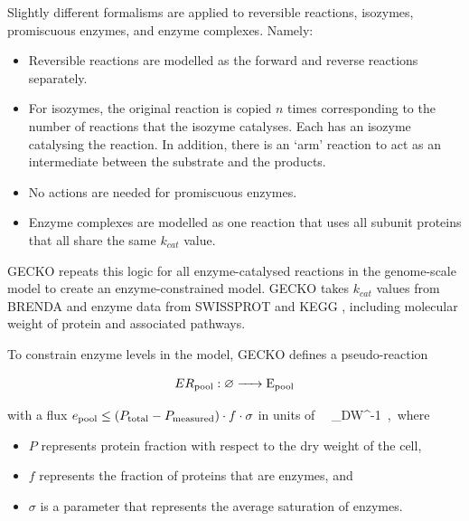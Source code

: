 
Slightly different formalisms are applied to reversible reactions, isozymes, promiscuous enzymes, and enzyme complexes.  Namely:
\begin{itemize}
  \item Reversible reactions are modelled as the forward and reverse reactions separately.
  \item For isozymes, the original reaction is copied $n$ times corresponding to the number of reactions that the isozyme catalyses. Each has an isozyme catalysing the reaction.
  In addition, there is an `arm' reaction to act as an intermediate between the substrate and the products.
  \item No actions are needed for promiscuous enzymes.
  \item Enzyme complexes are modelled as one reaction that uses all subunit proteins that all share the same $k_{cat}$ value.
\end{itemize}

GECKO repeats this logic for all enzyme-catalysed reactions in the genome-scale model to create an enzyme-constrained model.
GECKO takes $k_{cat}$ values from BRENDA \parencite{changBRENDAELIXIRCore2021} and enzyme data from SWISSPROT \parencite{theuniprotconsortiumUniProtUniversalProtein2023} and KEGG \parencite{kanehisaKEGGTaxonomybasedAnalysis2023}, including molecular weight of protein and associated pathways.

To constrain enzyme levels in the model, GECKO defines a pseudo-reaction

\begin{equation}
  ER_{\mathrm{pool}}: \varnothing \ce{ -> E_{pool} }
  \label{eq:model-gecko-enzyme-pool}
\end{equation}

with a flux $e_{\mathrm{pool}} \leq (P_{\mathrm{total}} - P_{\mathrm{measured}}) \cdot f \cdot \sigma$ in units of \SI{}{\gram~\gram_{DW}^{-1}}, where

\begin{itemize}
  \item $P$ represents protein fraction with respect to the dry weight of the cell,
  \item $f$ represents the fraction of proteins that are enzymes, and
  \item $\sigma$ is a parameter that represents the average saturation of enzymes.
\end{itemize}


